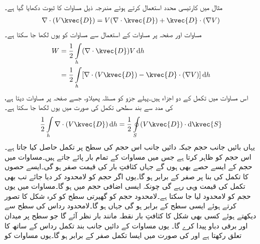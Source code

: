 مثال  میں کارتیسی محدد استعمال کرتے ہوئے مندرجہ ذیل مساوات کا ثبوت دکھایا گیا ہے۔
\begin{align}\label{مساوات_توانائی_توانائی_ضرب_برقی_بہاو_کی_ڈھلوان}
\nabla \cdot  (V \kvec{D})=V (\nabla \cdot \kvec{D})+\kvec{D} \cdot (\nabla V)
\end{align}
مساوات  اور  صفحہ  پر مساوات  کے استعمال سے مساوات  کو یوں لکھا جا سکتا ہے۔
\begin{gather}
\begin{aligned}\label{مساوات_توانائی_کا_تکمل}
W&=\frac{1}{2}\int\limits_h (\nabla \cdot \kvec{D} )V \dif h\\
&=\frac{1}{2} \int \limits_h [\nabla \cdot (V \kvec{D})-\kvec{D} \cdot (\nabla V)] \dif h
\end{aligned}
\end{gather}
اس مساوات میں تکمل کے دو اجزاء ہیں۔پہلے جزو کو مسئلہ پھیلاو، جسے صفحہ  پر مساوات   دیتا ہے، کی مدد سے بند سطحی تکمل کی صورت میں یوں لکھا جا سکتا ہے۔
\begin{align}\label{مساوات_توانائی_لامحدود_سطح_بند_تکمل_صفر}
\frac{1}{2}\int\limits_h \nabla \cdot (V \kvec{D}) \dif h = \frac{1}{2}\oint \limits_S (V \kvec{D}) \cdot \dif \kvec{S}
\end{align} 
یہاں بائیں جانب حجم  جبکہ دائیں جانب اس حجم کی سطح  پر تکمل حاصل کیا جاتا ہے۔ اس حجم کو ظاہر کرتا ہے جس میں مساوات  کے تمام بار پائے جاتے ہیں۔مساوات  میں حجم کے ایسے حصے بھی ہوں گے جہاں کثافتِ بار  کی قیمت صفر ہو گی۔ایسے حصوں کا تکمل  کی بنا پر صفر کے برابر ہو گا۔یوں اگر حجم کو لامحدود کر دیا جائے تب بھی تکمل کی قیمت وہی رہے گی چونکہ ایسی اضافی حجم میں   ہو گا۔مساوات  میں یوں حجم کو لامحدود لیا جا سکتا ہے۔لامحدود حجم کو گھیرتی سطح کو کرہ شکل کا تصور کرتے ہوئے ایسی سطح  کے برابر ہو گی جہاں  ہو گا۔لامحدود رداس کی سطح سے دیکھتے ہوئے کسی بھی شکل کا کثافتِ بار نقطہ مانند بار  نظر آئے گا جو سطح پر  میدان اور  برقی دباو پیدا کرے گا۔ یوں مساوات   کے دائیں جانب بند تکمل رداس کے ساتھ  کا تعلق رکھتا ہے اور  کی صورت میں ایسا تکمل صفر کے برابر ہو گا۔یوں  مساوات  کو
